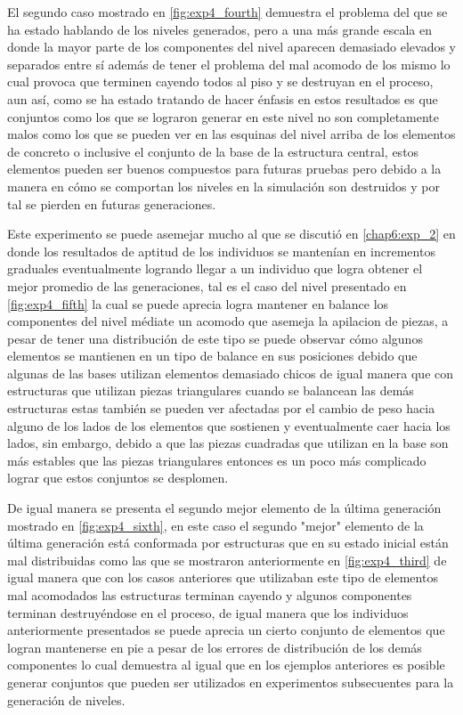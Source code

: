 El segundo caso mostrado en \ref{fig:exp4_fourth} demuestra el problema del que
se ha estado hablando de los niveles generados, pero a una más grande escala en
donde la mayor parte de los componentes del nivel aparecen demasiado elevados y
separados entre sí además de tener el problema del mal acomodo de los mismo lo
cual provoca que terminen cayendo todos al piso y se destruyan en el proceso,
aun así, como se ha estado tratando de hacer énfasis en estos resultados es que
conjuntos como los que se lograron generar en este nivel no son completamente
malos como los que se pueden ver en las esquinas del nivel arriba de los
elementos de concreto o inclusive el conjunto de la base de la estructura
central, estos elementos pueden ser buenos compuestos para futuras pruebas pero
debido a la manera en cómo se comportan los niveles en la simulación son
destruidos y por tal se pierden en futuras generaciones.

Este experimento se puede asemejar mucho al que se discutió en \ref{chap6:exp_2}
en donde los resultados de aptitud de los individuos se mantenían en incrementos
graduales eventualmente logrando llegar a un individuo que logra obtener el
mejor promedio de las generaciones, tal es el caso del nivel presentado en
\ref{fig:exp4_fifth} la cual se puede aprecia logra mantener en balance los
componentes del nivel médiate un acomodo que asemeja la apilacion de piezas, a
pesar de tener una distribución de este tipo se puede observar cómo algunos
elementos se mantienen en un tipo de balance en sus posiciones debido que
algunas de las bases utilizan elementos demasiado chicos de igual manera que con
estructuras que utilizan piezas triangulares cuando se balancean las demás
estructuras estas también se pueden ver afectadas por el cambio de peso hacia
alguno de los lados de los elementos que sostienen y eventualmente caer hacia
los lados, sin embargo, debido a que las piezas cuadradas que utilizan en la base
son más estables que las piezas triangulares entonces es un poco más complicado
lograr que estos conjuntos se desplomen.

De igual manera se presenta el segundo mejor elemento de la última generación
mostrado en \ref{fig:exp4_sixth}, en este caso el segundo "mejor" elemento de la
última generación está conformada por estructuras que en su estado inicial están
mal distribuidas como las que se mostraron anteriormente en
\ref{fig:exp4_third} de igual manera que con los casos anteriores que utilizaban
este tipo de elementos mal acomodados las estructuras terminan cayendo y algunos
componentes terminan destruyéndose en el proceso, de igual manera que los
individuos anteriormente presentados se puede aprecia un cierto conjunto de
elementos que logran mantenerse en pie a pesar de los errores de distribución de
los demás componentes lo cual demuestra al igual que en los ejemplos anteriores
es posible generar conjuntos que pueden ser utilizados en experimentos
subsecuentes para la generación de niveles.


